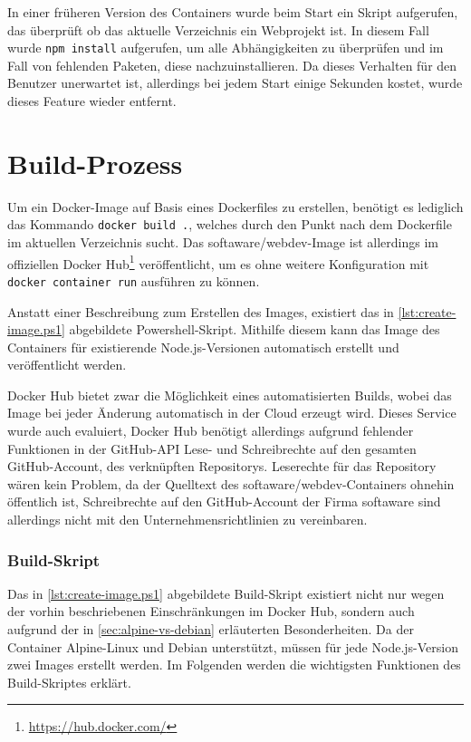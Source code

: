 In einer früheren Version des Containers wurde beim Start ein Skript aufgerufen, das überprüft ob das aktuelle Verzeichnis ein Webprojekt ist.
In diesem Fall wurde \verb|npm install| aufgerufen, um alle Abhängigkeiten zu überprüfen und im Fall von fehlenden Paketen, diese nachzuinstallieren.
Da dieses Verhalten für den Benutzer unerwartet ist, allerdings bei jedem Start einige Sekunden kostet, wurde dieses Feature wieder entfernt. 


\section{Build-Prozess}
\label{sec:build-process}
Um ein Docker-Image auf Basis eines Dockerfiles zu erstellen, benötigt es lediglich das Kommando \verb|docker build .|, welches durch den Punkt nach dem Dockerfile im aktuellen Verzeichnis sucht.
Das softaware/webdev-Image ist allerdings im offiziellen Docker Hub\footnote{\url{https://hub.docker.com/}} veröffentlicht, um es ohne weitere Konfiguration mit \verb|docker container run| ausführen zu können.

Anstatt einer Beschreibung zum Erstellen des Images, existiert das in \cref{lst:create-image.ps1} abgebildete Powershell-Skript.
Mithilfe diesem kann das Image des Containers für existierende Node.js-Versionen automatisch erstellt und veröffentlicht werden.

Docker Hub bietet zwar die Möglichkeit eines automatisierten Builds, wobei das Image bei jeder Änderung automatisch in der Cloud erzeugt wird.
Dieses Service wurde auch evaluiert, Docker Hub benötigt allerdings aufgrund fehlender Funktionen in der GitHub-API Lese- und Schreibrechte auf den gesamten GitHub-Account, des verknüpften Repositorys.
Leserechte für das Repository wären kein Problem, da der Quelltext des softaware/webdev-Containers ohnehin öffentlich ist, Schreibrechte auf den GitHub-Account der Firma softaware sind allerdings nicht mit den Unternehmensrichtlinien zu vereinbaren.

\subsubsection{Build-Skript}

Das in \cref{lst:create-image.ps1} abgebildete Build-Skript existiert nicht nur wegen der vorhin beschriebenen Einschränkungen im Docker Hub, sondern auch aufgrund der in \cref{sec:alpine-vs-debian} erläuterten Besonderheiten.
Da der Container Alpine-Linux und Debian unterstützt, müssen für jede Node.js-Version zwei Images erstellt werden.
Im Folgenden werden die wichtigsten Funktionen des Build-Skriptes erklärt.


